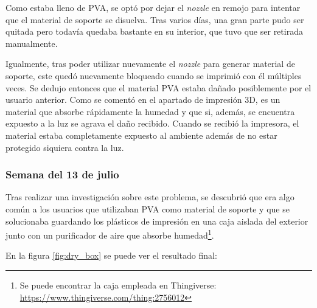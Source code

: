 Como estaba lleno de \ac{PVA}, se optó por dejar el \textit{nozzle} en remojo para
intentar que el material de soporte se disuelva. Tras varios días, una gran parte
pudo ser quitada pero todavía quedaba bastante en su interior, que tuvo que ser
retirada manualmente.

Igualmente, tras poder utilizar nuevamente el \textit{nozzle} para generar material
de soporte, este quedó nuevamente bloqueado cuando se imprimió con él múltiples veces. Se dedujo
entonces que el material \ac{PVA} estaba dañado posiblemente por el usuario anterior. Como se
comentó en el apartado de impresión 3D, es un material que absorbe rápidamente la
humedad y que si, además, se encuentra expuesto a la luz se agrava el daño recibido.
Cuando se recibió la impresora, el material estaba completamente expuesto al ambiente
además de no estar protegido siquiera contra la luz.

\subsubsection*{Semana del 13 de julio}
Tras realizar una investigación sobre este problema, se descubrió que era algo
común a los usuarios que utilizaban \ac{PVA} como material de soporte y que se
solucionaba guardando los plásticos de impresión en una caja aislada del exterior
junto con un purificador de aire que absorbe humedad\footnote{Se puede encontrar
la caja empleada en Thingiverse: \url{https://www.thingiverse.com/thing:2756012}}.

En la figura \ref{fig:dry_box} se puede ver el resultado final:

